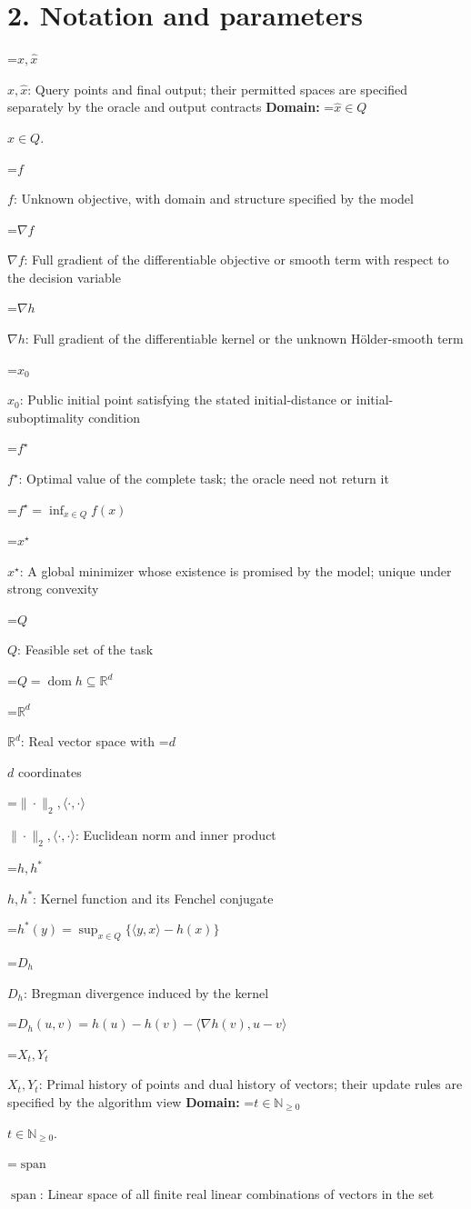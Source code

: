 \documentclass[10pt,a4paper]{article}
\newcommand{\AtlasMath}[1]{\par\begingroup\centering\setbox0=\hbox{$\displaystyle #1$}\ifdim\wd0>1.4\linewidth\typeout{ATLAS WIDE FORMULA: \the\wd0}\fi\ifdim\wd0>\linewidth\resizebox{\linewidth}{!}{\box0}\else\box0\fi\par\endgroup}
\newcommand{\AtlasInlineMath}[1]{\begingroup\setbox0=\hbox{$#1$}\ifdim\wd0>.4\linewidth\endgroup\AtlasMath{#1}\else\endgroup$#1$\fi}
\begin{document}
\section{2. Notation and parameters}
\AtlasInlineMath{x,\widehat{x}}: Query points and final output; their permitted spaces are specified separately by the oracle and output contracts \textbf{Domain:} \AtlasInlineMath{\widehat{x}\in Q}.

\AtlasInlineMath{f}: Unknown objective, with domain and structure specified by the model

\AtlasInlineMath{\nabla f}: Full gradient of the differentiable objective or smooth term with respect to the decision variable

\AtlasInlineMath{\nabla h}: Full gradient of the differentiable kernel or the unknown Hölder-smooth term

\AtlasInlineMath{x_0}: Public initial point satisfying the stated initial-distance or initial-suboptimality condition

\AtlasInlineMath{f^\star}: Optimal value of the complete task; the oracle need not return it


\AtlasMath{f^\star=\inf_{x\in Q}f(x)}


\AtlasInlineMath{x^\star}: A global minimizer whose existence is promised by the model; unique under strong convexity

\AtlasInlineMath{Q}: Feasible set of the task


\AtlasMath{Q=\operatorname{dom}h\subseteq\mathbb{R}^d}


\AtlasInlineMath{\mathbb{R}^d}: Real vector space with \AtlasInlineMath{d} coordinates

\AtlasInlineMath{\|\cdot\|_2,\langle\cdot,\cdot\rangle}: Euclidean norm and inner product

\AtlasInlineMath{h,h^*}: Kernel function and its Fenchel conjugate


\AtlasMath{h^*(y)=\sup_{x\in Q}\{\langle y,x\rangle-h(x)\}}


\AtlasInlineMath{D_h}: Bregman divergence induced by the kernel


\AtlasMath{D_h(u,v)=h(u)-h(v)-\langle\nabla h(v),u-v\rangle}


\AtlasInlineMath{X_t,Y_t}: Primal history of points and dual history of vectors; their update rules are specified by the algorithm view \textbf{Domain:} \AtlasInlineMath{t\in\mathbb{N}_{\ge0}}.

\AtlasInlineMath{\operatorname{span}}: Linear space of all finite real linear combinations of vectors in the set
\end{document}
